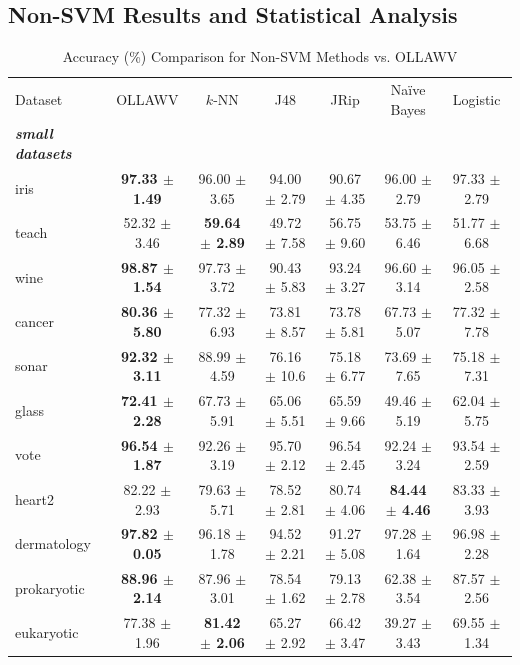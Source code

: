 \documentclass[reqno]{vcuthesis}
\numberwithin{equation}{chapter}
\begin{document}
\subsection{Non-SVM Results and Statistical Analysis}
\begin{table}[t!]
\caption{Accuracy (\%) Comparison for Non-SVM Methods vs. OLLAWV}
\scriptsize
\centering
\label{tab:OtherResultsacc}
\begin{tabularx}{\textwidth}{l@{\extracolsep{\fill}}cccccc}
\noalign{\smallskip}\hline\noalign{\smallskip}
Dataset & OLLAWV & $k$-NN & J48 & JRip & Na\"ive Bayes & Logistic \\
\noalign{\smallskip}\hline\noalign{\smallskip}
\textbf{\textit{small datasets}} & & & & & & \\
iris & \textbf{97.33 $\pm$ 1.49} & 96.00 $\pm$ 3.65 & 94.00 $\pm$ 2.79 & 90.67 $\pm$ 4.35 & 96.00 $\pm$ 2.79 & 97.33 $\pm$ 2.79  \\
teach & 52.32 $\pm$ 3.46 & \textbf{59.64 $\pm$ 2.89} & 49.72 $\pm$ 7.58 & 56.75 $\pm$ 9.60 & 53.75 $\pm$ 6.46 & 51.77 $\pm$ 6.68 \\
wine & \textbf{98.87 $\pm$ 1.54} & 97.73 $\pm$ 3.72 & 90.43 $\pm$ 5.83 & 93.24 $\pm$ 3.27 & 96.60 $\pm$ 3.14 & 96.05 $\pm$ 2.58 \\
cancer & \textbf{80.36 $\pm$ 5.80} & 77.32 $\pm$ 6.93 & 73.81 $\pm$ 8.57 & 73.78 $\pm$ 5.81 & 67.73 $\pm$ 5.07 & 77.32 $\pm$ 7.78 \\
sonar & \textbf{92.32 $\pm$ 3.11} & 88.99 $\pm$ 4.59 & 76.16 $\pm$ 10.6 & 75.18 $\pm$ 6.77 & 73.69 $\pm$ 7.65 & 75.18 $\pm$ 7.31 \\
glass & \textbf{72.41 $\pm$ 2.28} & 67.73 $\pm$ 5.91 & 65.06 $\pm$ 5.51 & 65.59 $\pm$ 9.66 & 49.46 $\pm$ 5.19 & 62.04 $\pm$ 5.75 \\
vote & \textbf{96.54 $\pm$ 1.87} & 92.26 $\pm$ 3.19 & 95.70 $\pm$ 2.12 & 96.54 $\pm$ 2.45 & 92.24 $\pm$ 3.24 & 93.54 $\pm$ 2.59 \\
heart2 & 82.22 $\pm$ 2.93 & 79.63 $\pm$ 5.71 & 78.52 $\pm$ 2.81 & 80.74 $\pm$ 4.06 & \textbf{84.44 $\pm$ 4.46} & 83.33 $\pm$ 3.93 \\
dermatology & \textbf{97.82 $\pm$ 0.05} & 96.18 $\pm$ 1.78 & 94.52 $\pm$ 2.21 & 91.27 $\pm$ 5.08 & 97.28 $\pm$ 1.64 & 96.98 $\pm$ 2.28 \\
prokaryotic & \textbf{88.96 $\pm$ 2.14} & 87.96 $\pm$ 3.01 & 78.54 $\pm$ 1.62 & 79.13 $\pm$ 2.78 & 62.38 $\pm$ 3.54 & 87.57 $\pm$ 2.56 \\
eukaryotic & 77.38 $\pm$ 1.96 & \textbf{81.42 $\pm$ 2.06} & 65.27 $\pm$ 2.92 & 66.42 $\pm$ 3.47 & 39.27 $\pm$ 3.43 & 69.55 $\pm$ 1.34 \\

\end{tabularx}
\end{table}
\end{document}

